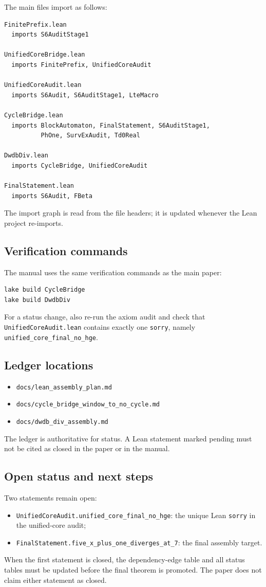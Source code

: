 The main files import as follows:
\begin{verbatim}
FinitePrefix.lean
  imports S6AuditStage1

UnifiedCoreBridge.lean
  imports FinitePrefix, UnifiedCoreAudit

UnifiedCoreAudit.lean
  imports S6Audit, S6AuditStage1, LteMacro

CycleBridge.lean
  imports BlockAutomaton, FinalStatement, S6AuditStage1,
          PhOne, SurvExAudit, Td0Real

DwdbDiv.lean
  imports CycleBridge, UnifiedCoreAudit

FinalStatement.lean
  imports S6Audit, FBeta
\end{verbatim}

The import graph is read from the file headers; it is updated whenever
the Lean project re-imports.

\subsection{Verification commands}

The manual uses the same verification commands as the main paper:
\begin{verbatim}
lake build CycleBridge
lake build DwdbDiv
\end{verbatim}
For a status change, also re-run the axiom audit and check that
\texttt{UnifiedCoreAudit.lean} contains exactly one \texttt{sorry},
namely \texttt{unified\_core\_final\_no\_hge}.

\subsection{Ledger locations}

\begin{itemize}[leftmargin=*]
\item \texttt{docs/lean\_assembly\_plan.md}
\item \texttt{docs/cycle\_bridge\_window\_to\_no\_cycle.md}
\item \texttt{docs/dwdb\_div\_assembly.md}
\end{itemize}

The ledger is authoritative for status.  A Lean statement marked
pending must not be cited as closed in the paper or in the manual.

\subsection{Open status and next steps}

Two statements remain open:
\begin{itemize}[leftmargin=*]
\item \texttt{UnifiedCoreAudit.unified\_core\_final\_no\_hge}:
  the unique Lean \texttt{sorry} in the unified-core audit;
\item \texttt{FinalStatement.five\_x\_plus\_one\_diverges\_at\_7}:
  the final assembly target.
\end{itemize}

When the first statement is closed, the dependency-edge table and all
status tables must be updated before the final theorem is promoted.
The paper does not claim either statement as closed.
